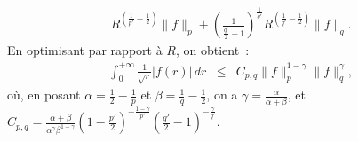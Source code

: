 {\begin{enumerate}
{\begin{eqnarray*}
R^{\left(\frac{1}{p'}-\frac{1}{2}\right)}\|f\|_{p} +
\left(\frac{1}{\frac{q'}{2} - 1}\right)^{\frac{1}{q'}}
R^{\left(\frac{1}{q'}-\frac{1}{2}\right)} \|f\|_{q}.
\end{eqnarray*}
En optimisant par rapport \`a $R$, on obtient~:
\begin{eqnarray*}
\int_{0}^{+\infty} \frac{1}{\sqrt{r}} |f(r)|\,dr &\leq & C_{p,q}
\|f\|_{p}^{1-\gamma}\|f\|_{q}^{\gamma},
\end{eqnarray*}
o\`u, en posant $\alpha =  \frac{1}{2}- \frac{1}{p}$ et $\beta =
 \frac{1}{q} - \frac{1}{2}$, on a $\gamma =
\frac{\alpha}{\alpha+\beta}$, et $C_{p,q} = \frac{\alpha +
\beta}{\alpha^{\gamma} \beta^{1-\gamma}}\left(1-\frac{p'}{2}
\right)^{-\frac{1-\gamma}{p'}}\left(\frac{q'}{2} - 1
\right)^{-\frac{\gamma}{q'}}$.}
\end{enumerate}
}
